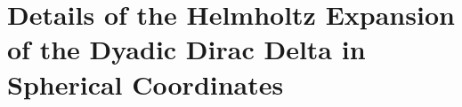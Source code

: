
\section{Details of the Helmholtz Expansion of the Dyadic Dirac Delta in Spherical Coordinates}\label{app:helmholtzDelta}









